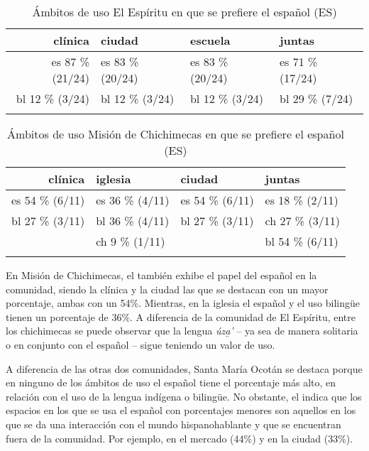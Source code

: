 \documentclass[output=paper]{../langscibook}
\begin{document}
\begin{table}
\caption{\label{tab:guerrero:15} Ámbitos de uso El Espíritu en que se prefiere el español (ES)}
\begin{tabularx}{\textwidth}{rYYY}
\lsptoprule
{clínica} & {{ciudad}} & {{escuela}} & {{juntas}}\\
\midrule
{{es} {87} {\%} {(21/24)}} & {{es} {83} {\%} {(20/24)}} & {{es} {83} {\%} {(20/24)}} & {{es} {71} {\%} {(17/24)}}\\
{{bl} {12} {\%} {(3/24)}} & {{bl} {12} {\%} {(3/24)}} & {{bl} {12} {\%} {(3/24)}} & {{bl} {29} {\%} {(7/24)}}\\
\lspbottomrule
\end{tabularx}
\end{table}

\begin{table}[b]
\caption{\label{tab:guerrero:16} Ámbitos de uso Misión de Chichimecas en que se prefiere el español (ES)}
\begin{tabularx}{\textwidth}{rYYY}
\lsptoprule
{{clínica}} & {{iglesia}} & {{ciudad}} & {{juntas}}\\
\midrule
{{es} {54} {\%} {(6/11)}} & {{es} {36} {\%} {(4/11)}} & {{es} {54} {\%} {(6/11)}} & {{es} {18} {\%} {(2/11)}}\\
{{bl} {27} {\%} {(3/11)}} & {{bl} {36} {\%} {(4/11)}} & {{bl} {27} {\%} {(3/11)}} & {{ch} {27} {\%} {(3/11)}}\\
& {{ch} {9} {\%} {(1/11)}} &  & {{bl} {54} {\%} {(6/11)}}\\
\lspbottomrule
\end{tabularx}
\end{table}

\largerpage
En Misión de Chichimecas, el  también exhibe el papel del español en la comunidad, siendo la clínica y la ciudad las que se destacan con un mayor porcentaje, ambas con un 54\%. Mientras, en la iglesia el español y el uso bilingüe tienen un porcentaje de 36\%. A diferencia de la comunidad de El Espíritu, entre los chichimecas se puede observar que la lengua \textit{úza̱'} -- ya sea de manera solitaria o en conjunto con el español -- sigue teniendo un valor de uso.



A diferencia de las otras dos comunidades, Santa María Ocotán se destaca porque en ninguno de los ámbitos de uso el español tiene el porcentaje más alto, en relación con el uso de la lengua indígena o bilingüe. No obstante, el  indica que los espacios en los que se usa el español con porcentajes menores son aquellos en los que se da una interacción con el mundo hispanohablante y que se encuentran fuera de la comunidad. Por ejemplo, en el mercado (44\%) y en la ciudad (33\%).
\end{document}
